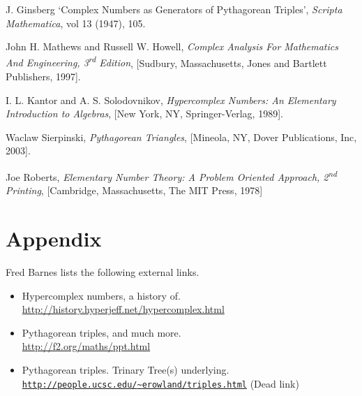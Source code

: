 \documentclass{article}
\theoremstyle{definition}
\begin{document}


\renewcommand{\refname}{\section{Bibliography}}
\begin{thebibliography}{9}

   J. Ginsberg `Complex Numbers as Generators of Pythagorean Triples', \textit{Scripta Mathematica}, vol 13 (1947), 105.

   John H. Mathews and Russell W. Howell, \textit{Complex Analysis For Mathematics And Engineering, 3\textsuperscript{rd} Edition}, [Sudbury, Massachusetts, Jones and Bartlett Publishers, 1997].

   I. L. Kantor and A. S. Solodovnikov, \textit{Hypercomplex Numbers: An Elementary Introduction to Algebras}, [New York, NY, Springer-Verlag, 1989].

   Waclaw Sierpinski, \textit{Pythagorean Triangles}, [Mineola, NY, Dover Publications, Inc, 2003].

   Joe Roberts, \textit{Elementary Number Theory: A Problem Oriented Approach, 2\textsuperscript{nd} Printing}, [Cambridge, Massachusetts, The MIT Press, 1978]

\end{thebibliography}

\section{Appendix}

Fred Barnes lists the following external links.

\begin{itemize}
\item Hypercomplex numbers, a history of. \\ \url{http://history.hyperjeff.net/hypercomplex.html}
\item Pythagorean triples, and much more. \\ \url{http://f2.org/maths/ppt.html}
\item Pythagorean triples. Trinary Tree(s) underlying. \\ \href{http://people.ucsc.edu/~erowland/triples.html}{\texttt{http://people.ucsc.edu/{\textasciitilde}erowland/triples.html}} (Dead link)
\end{itemize}
\end{document}
